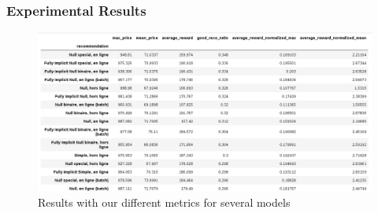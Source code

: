 \documentclass{beamer}
\begin{document}
\begin{frame}
	\frametitle{Experimental Results}
	\begin{figure}
	\centering
	\includegraphics[width=\textwidth]{resultats.png}
	\caption{Results with our different metrics for several models}	
	\end{figure}

	
\end{frame}
\end{document}
